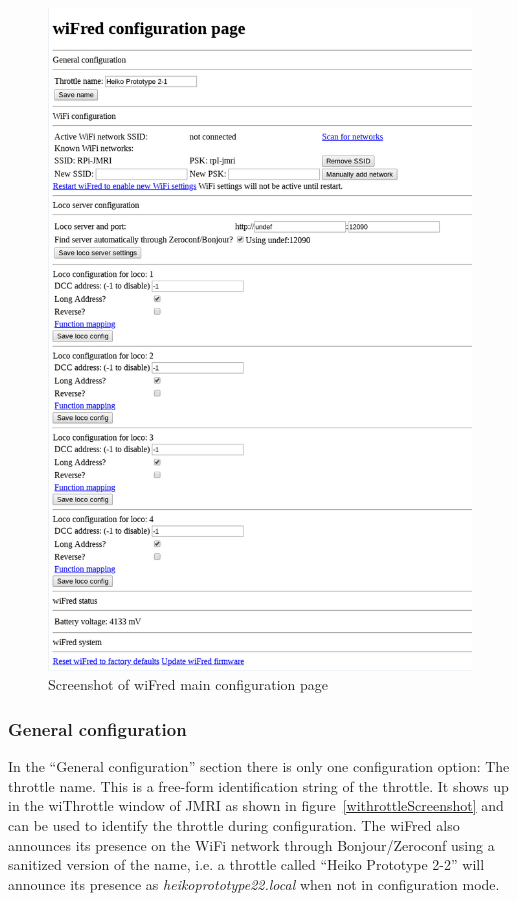 \documentclass[11pt,a4paper]{scrartcl}
\begin{document}
\begin{figure}[tbhp]
  \centering
  \includegraphics[width=0.8 \textwidth]{images/wiFred_configuration_page}
  \caption{Screenshot of wiFred main configuration page}
  \label{throttleConfMainPage}
\end{figure}

\subsubsection{General configuration} \label{throttle_GeneralConf}

In the ``General configuration'' section there is only one configuration option: The throttle name. This is a free-form identification string of the throttle. It shows up in the wiThrottle window of JMRI as shown in figure~\ref{withrottleScreenshot} and can be used to identify the throttle during configuration. The wiFred also announces its presence on the WiFi network through Bonjour/Zeroconf using a sanitized version of the name, i.e. a throttle called ``Heiko Prototype 2-2'' will announce its presence as \textit{heikoprototype22.local} when not in configuration mode.
\end{document}
